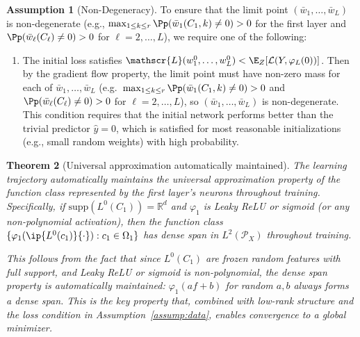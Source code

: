 \documentclass[nohyperref]{article}
\theoremstyle{plain}
\newtheorem{theorem}{Theorem}[section]
\theoremstyle{definition}
\newtheorem{assumption}[theorem]{Assumption}
\theoremstyle{remark}
\begin{document}
\begin{assumption}[Non-Degeneracy]
\label{assump:lr}
To ensure that the limit point $(\bar{w}_1,\ldots,\bar{w}_L)$ is non-degenerate (e.g., $\max_{1\le k\le r}\Pp(\bar{w}_1(C_1,k)\ne 0)>0$ for the first layer and $\Pp(\bar{w}_\ell(C_\ell)\ne 0)>0$ for $\ell=2,\ldots,L$), we require one of the following:
\begin{enumerate}
\item The initial loss satisfies $\mathscr{L}(w_1^0,\ldots,w_L^0) < \E_Z[\mathcal{L}(Y,\varphi_L(0))]$. Then by the gradient flow property, the limit point must have non-zero mass for each of $\bar{w}_1,\ldots,\bar{w}_L$ (e.g.\ $\max_{1\le k\le r}\Pp(\bar{w}_1(C_1,k)\ne 0)>0$ and $\Pp(\bar{w}_\ell(C_\ell)\ne 0)>0$ for $\ell=2,\ldots,L$), so $(\bar{w}_1,\ldots,\bar{w}_L)$ is non-degenerate. This condition requires that the initial network performs better than the trivial predictor $\hat y=0$, which is satisfied for most reasonable initializations (e.g., small random weights) with high probability.

\end{enumerate}
\end{assumption}

\begin{theorem}[Universal approximation automatically maintained]
\label{thm:uap-automatic}
The learning trajectory automatically maintains the universal approximation property of the function class represented by the first layer's neurons throughout training. Specifically, if $\text{supp}(L^0(C_1)) = \mathbb{R}^d$ and $\varphi_1$ is Leaky ReLU or sigmoid (or any non-polynomial activation), then the function class $\{\varphi_1(\ip{L^0(c_1)}{\cdot}): c_1\in\Omega_1\}$ has dense span in $L^2(\mathcal{P}_X)$ throughout training.

This follows from the fact that since $L^0(C_1)$ are frozen random features with full support, and Leaky ReLU or sigmoid is non-polynomial, the dense span property is automatically maintained: $\varphi_1(af+b)$ for random $a,b$ always forms a dense span. This is the key property that, combined with low-rank structure and the loss condition in Assumption~\ref{assump:data}, enables convergence to a global minimizer.
\end{theorem}
\end{document}

